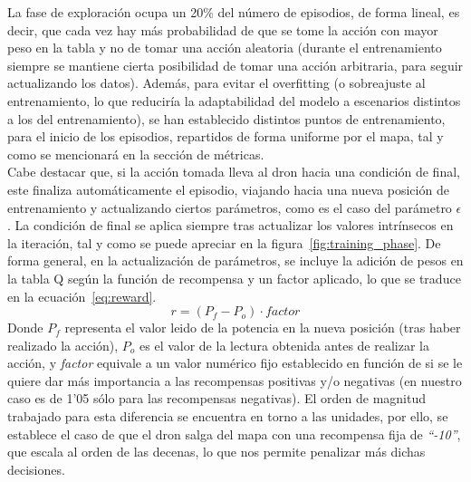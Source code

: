 La fase de exploración ocupa un 20\% del número de episodios, de forma lineal, es decir, que cada vez hay más probabilidad de que se tome la acción con mayor peso en la tabla y no de tomar una acción aleatoria (durante el entrenamiento siempre se mantiene cierta posibilidad de tomar una acción arbitraria, para seguir actualizando los datos). Además, para evitar el overfitting (o sobreajuste al entrenamiento, lo que reduciría la adaptabilidad del modelo a escenarios distintos a los del entrenamiento), se han establecido distintos puntos de entrenamiento, para el inicio de los episodios, repartidos de forma uniforme por el mapa, tal y como se mencionará en la sección de métricas.\\

Cabe destacar que, si la acción tomada lleva al dron hacia una condición de final, este finaliza automáticamente el episodio, viajando hacia una nueva posición de entrenamiento y actualizando ciertos parámetros, como es el caso  del parámetro $\epsilon$. La condición de final se aplica siempre tras actualizar los valores intrínsecos en la iteración, tal y como se puede apreciar en la figura~\ref{fig:training_phase}. De forma general, en la actualización de parámetros, se incluye la adición de pesos en la tabla Q según la función de recompensa y un factor aplicado, lo que se traduce en la ecuación~\ref{eq:reward}.
\begin{equation}
    r = (P_f - P_o) \cdot factor
    \label{eq:reward}
\end{equation}
Donde $P_f$ representa el valor leido de la potencia en la nueva posición (tras haber realizado la acción), $P_o$ es el valor de la lectura obtenida antes de realizar la acción, y \emph{factor} equivale a un valor numérico fijo establecido en función de si se le quiere dar más importancia a las recompensas positivas y/o negativas (en nuestro caso es de 1'05 sólo para las recompensas negativas). El orden de magnitud trabajado para esta diferencia se encuentra en torno a las unidades, por ello, se establece el caso de que el dron salga del mapa con una recompensa fija de \emph{``-10''}, que escala al orden de las decenas, lo que nos permite penalizar más dichas decisiones.\\

